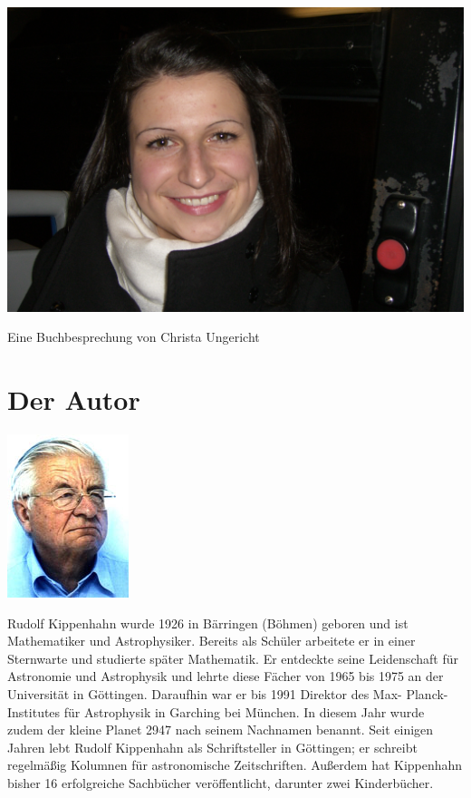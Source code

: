 \documentclass[a4paper,12pt]{article}
\begin{document}
\begin{center}
\includegraphics[width=4 cm]{portrait.jpg}
\end{center}

\begin{center}
 \large{Eine Buchbesprechung von Christa Ungericht}
\end{center}
\newpage

\section{Der Autor}\newline
\begin{center}	
		\includegraphics[width=3 cm]{RKip.jpg}
\end{center}

Rudolf Kippenhahn wurde 1926 in Bärringen (Böhmen) geboren und ist Mathematiker und Astrophysiker. Bereits als Schüler arbeitete er in einer Sternwarte und studierte später Mathematik. Er entdeckte seine Leidenschaft für Astronomie und Astrophysik und lehrte diese Fächer von 1965 bis 1975 an der Universität in Göttingen. Daraufhin war er bis 1991 Direktor des Max- Planck- Institutes für Astrophysik in Garching bei München. In diesem Jahr wurde zudem der kleine Planet 2947 nach seinem Nachnamen benannt. Seit einigen Jahren lebt Rudolf Kippenhahn als Schriftsteller in Göttingen; er schreibt regelmäßig Kolumnen für astronomische Zeitschriften. Außerdem hat Kippenhahn bisher 16 erfolgreiche Sachbücher veröffentlicht, darunter zwei Kinderbücher.
\end{document}
